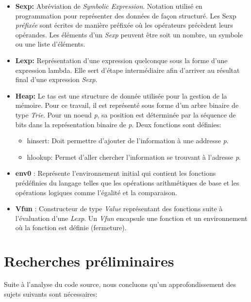 \documentclass[12pt]{article}
\begin{document}
\begin{itemize} 
    \item\textbf{Sexp:} Abréviation de \textit{Symbolic Expression}. Notation utilisé en programmation pour représenter des données de façon structuré. Les Sexp \textit{préfixée} sont écrites de manière préfixée où les opérateurs précèdent leurs opérandes. Les éléments d'un \textit{Sexp} peuvent être soit un nombre, un symbole ou une liste d'éléments. 
    
    \item \textbf{Lexp:} Représentation d'une expression quelconque sous la forme d'une expression lambda. Elle sert d'étape intermédiaire afin d'arriver au résultat final d'une expression \textit{Sexp}.
    
    \item\textbf{Heap:} Le tas est une structure de donnée utilisée pour la gestion de la mémoire. Pour ce travail, il est représenté sous forme d'un arbre binaire de type \textit{Trie}. Pour un noeud \textit{p}, sa position est déterminée par la séquence de bits dans la représentation binaire de \textit{p}. Deux fonctions sont définies:
    
    \begin{itemize}
        \item {hinsert:} Doit permettre d'ajouter de l'information à une addresse \textit{p}.
        \item {hlookup:} Permet d'aller chercher l'information se trouvant à l'adresse \textit{p}.
    \end{itemize}
    
    \item \textbf{env0} : Représente l'environnement initial qui contient les fonctions prédéfinies du langage telles que les opérations arithmétiques de base et les opérations logiques comme l'égalité et la comparaison.  
    
    \item \textbf{Vfun} : Constructeur de type \textit{Value} représentant des fonctions suite à l'évaluation d'une \textit{Lexp}. Un \textit{Vfun} encapsule une fonction et un environnement où la fonction est définie (fermeture).
\end{itemize}

\section{Recherches préliminaires}
Suite à l'analyse du code source, nous concluons qu'un approfondissement des sujets suivants sont nécessaires: 
\end{document}
